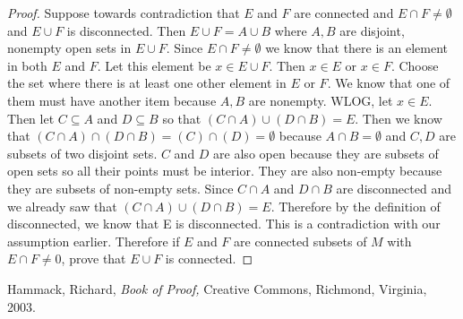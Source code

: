 \documentclass{article}
\begin{document}
\begin{proof}
Suppose towards contradiction that $E$ and $F$ are connected and $E \cap F \neq \emptyset$ and $E\cup F$ is disconnected. Then $E\cup F = A \cup B$ where $A,B$ are disjoint, nonempty open sets in $E\cup F$. Since $E\cap F \neq \emptyset$ we know that there is an element in both $E$ and $F$. Let this element be $x\in E \cup F$. Then $x \in E$ or $x \in F$. Choose the set where there is at least one other element in $E$ or $F$. We know that one of them must have another item because $A,B$ are nonempty. WLOG, let $x \in E$. Then let $C \subseteq A$ and $D \subseteq B$ so that $(C \cap A)\cup (D\cap B)= E$. Then we know that $(C \cap A)\cap (D\cap B)= (C)\cap (D)= \emptyset$ because $A\cap B = \emptyset$ and $C,D$ are subsets of two disjoint sets. $C$ and $D$ are also open because they are subsets of open sets so all their points must be interior. They are also non-empty because they are subsets of non-empty sets. Since $C\cap A$ and $D\cap B$ are disconnected and we already saw that $(C \cap A)\cup (D\cap B)= E$. Therefore by the definition of disconnected, we know that E is disconnected. This is a contradiction with our assumption earlier. Therefore if $E$ and $F$ are connected subsets of $M$ with $E \cap F \neq 0$, prove that $E\cup F$ is connected.
\end{proof}


\begin{thebibliography}{9}

Hammack, Richard,
  \textit{Book of Proof,}
Creative Commons, Richmond, Virginia,
  2003.

\end{thebibliography}
\end{document}

